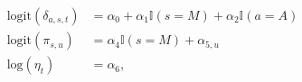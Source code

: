 \begin{equation}
  \begin{aligned}
    \text{logit}(\delta_{a, s, t}) &= \alpha_{0} + \alpha_{1}\mathbb{I}(s = M) + \alpha_{2}\mathbb{I}(a = A) \\
    \text{logit}(\pi_{s, u}) &= \alpha_{4} \mathbb{I}(s = M) + \alpha_{5, u} \\
    \text{log}(\eta_{t}) &= \alpha_{6},
  \end{aligned}
  \label{eqn:parameterisation-info}
\end{equation}